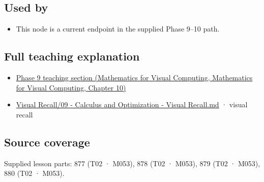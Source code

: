 \subsection{Used by}\label{appendix-2c2df8345991-used-by}

\begin{itemize}
\tightlist
\item
  This node is a current endpoint in the supplied Phase 9--10 path.
\end{itemize}

\subsection{Full teaching explanation}\label{appendix-2c2df8345991-full-teaching-explanation}

\begin{itemize}
\tightlist
\item
  \href{../02-Mathematics-for-Visual-Computing/main.pdf\#nameddest=02-foundations-ii-ch026-optimization-and-inverse-problems}{Phase 9 teaching section (Mathematics for Visual Computing, Mathematics for Visual Computing, Chapter 10)}
\item
  \hyperref[appendix-adf48f5dc5c1]{Visual Recall/09 - Calculus and Optimization - Visual Recall.md} · visual recall
\end{itemize}

\subsection{Source coverage}\label{appendix-2c2df8345991-source-coverage}

Supplied lesson parts: 877 (T02 · M053), 878 (T02 · M053), 879 (T02 · M053), 880 (T02 · M053).
